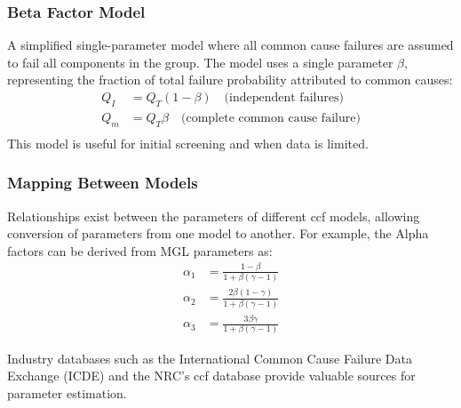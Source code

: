 \subsubsection{Beta Factor Model}
A simplified single-parameter model where all common cause failures are assumed to fail all components in the group. The model uses a single parameter $\beta$, representing the fraction of total failure probability attributed to common causes:
\[
\begin{aligned}
Q_I &= Q_T(1-\beta) \quad \text{(independent failures)} \\
Q_m &= Q_T\beta \quad \text{(complete common cause failure)} \\
\end{aligned}
\]
This model is useful for initial screening and when data is limited.

\subsubsection{Mapping Between Models}
Relationships exist between the parameters of different \acrshort{ccf} models, allowing conversion of parameters from one model to another. For example, the Alpha factors can be derived from MGL parameters as:
\[
\begin{aligned}
\alpha_1 &= \frac{1-\beta}{1+\beta(\gamma-1)} \\
\alpha_2 &= \frac{2\beta(1-\gamma)}{1+\beta(\gamma-1)} \\
\alpha_3 &= \frac{3\beta\gamma}{1+\beta(\gamma-1)}
\end{aligned}
\]

Industry databases such as the International Common Cause Failure Data Exchange (ICDE) \cite{ICDE} and the NRC's \acrshort{ccf} database \cite{ma_ccf_2022} provide valuable sources for parameter estimation.
